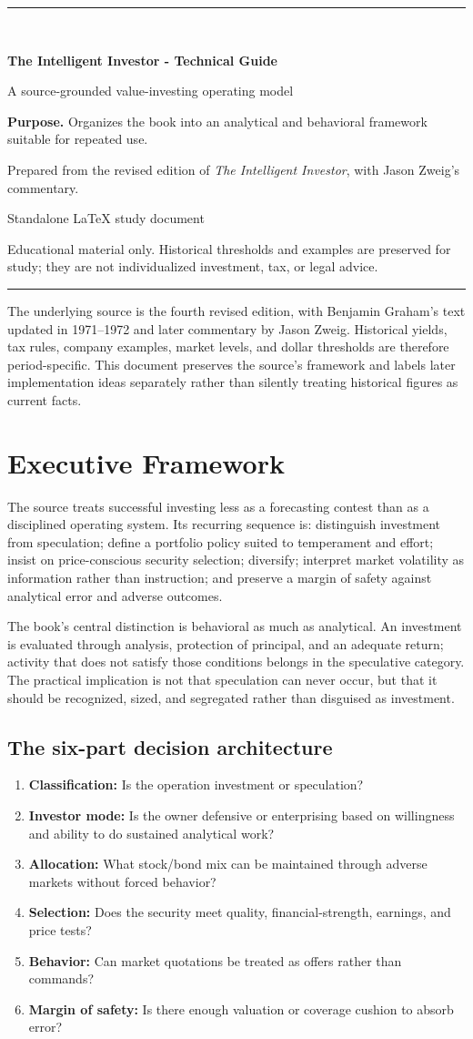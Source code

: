 \documentclass[11pt]{article}
\newcommand{\makedoccover}[4]{%
\hypersetup{pageanchor=false}%
\begin{titlepage}
\thispagestyle{empty}
\vspace*{1.0in}
{\color{Navy}\rule{\linewidth}{2.2pt}}\\[0.55in]
{\Huge\bfseries\color{Navy} #1\par}
\vspace{0.18in}
{\Large\color{Teal} #2\par}
\vspace{0.5in}
\begin{tcolorbox}[colback=LightGray,colframe=Gray,boxrule=0.5pt,arc=2mm]
\textbf{Purpose.} #3
\end{tcolorbox}
\vfill
{\large Prepared from the revised edition of \textit{The Intelligent Investor}, with Jason Zweig's commentary.\par}
\vspace{0.12in}
{\small #4\par}
\vspace{0.25in}
{\small\color{Gray}\parbox{0.90\textwidth}{\centering Educational material only. Historical thresholds and examples are preserved for study; they are not individualized investment, tax, or legal advice.}}\par
\vspace{0.35in}
{\color{Navy}\rule{\linewidth}{2.2pt}}
\end{titlepage}\hypersetup{pageanchor=true}
}
\begin{document}
\makedoccover{The Intelligent Investor - Technical Guide}{A source-grounded value-investing operating model}{Organizes the book into an analytical and behavioral framework suitable for repeated use.}{Standalone LaTeX study document}
\tableofcontents\newpage

\begin{cautionbox}
The underlying source is the fourth revised edition, with Benjamin Graham's text updated in 1971--1972 and later commentary by Jason Zweig. Historical yields, tax rules, company examples, market levels, and dollar thresholds are therefore period-specific. This document preserves the source's framework and labels later implementation ideas separately rather than silently treating historical figures as current facts.
\end{cautionbox}

\section{Executive Framework}
\begin{principlebox}
The source treats successful investing less as a forecasting contest than as a disciplined operating system. Its recurring sequence is: distinguish investment from speculation; define a portfolio policy suited to temperament and effort; insist on price-conscious security selection; diversify; interpret market volatility as information rather than instruction; and preserve a margin of safety against analytical error and adverse outcomes.
\end{principlebox}

The book's central distinction is behavioral as much as analytical. An investment is evaluated through analysis, protection of principal, and an adequate return; activity that does not satisfy those conditions belongs in the speculative category. The practical implication is not that speculation can never occur, but that it should be recognized, sized, and segregated rather than disguised as investment.

\subsection{The six-part decision architecture}
\begin{enumerate}
\item \textbf{Classification:} Is the operation investment or speculation?
\item \textbf{Investor mode:} Is the owner defensive or enterprising based on willingness and ability to do sustained analytical work?
\item \textbf{Allocation:} What stock/bond mix can be maintained through adverse markets without forced behavior?
\item \textbf{Selection:} Does the security meet quality, financial-strength, earnings, and price tests?
\item \textbf{Behavior:} Can market quotations be treated as offers rather than commands?
\item \textbf{Margin of safety:} Is there enough valuation or coverage cushion to absorb error?
\end{enumerate}
\end{document}
